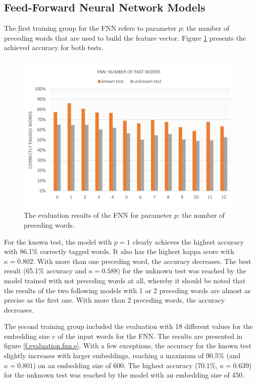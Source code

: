 \subsection{Feed-Forward Neural Network Models}\label{c.evaluation.results.fnn}
The \b{first training group} for the FNN refers to parameter $p$: the number of preceding words that are used to build the feature vector. Figure \ref{f.evaluation.fnn.p} presents the achieved accuracy for both tests.

\begin{figure}[H]
	\hspace{-5mm}\includegraphics[width=1.07\textwidth]{images/evaluation_fnn_p}
	\caption[FNN Evaluation: Number of Past Words]{The evaluation results of the FNN for parameter $p$: the number of preceding words.}
	\label{f.evaluation.fnn.p}
\end{figure}

For the known test, the model with $p=1$ clearly achieves the highest accuracy with 86.1\% correctly tagged words. It also has the highest kappa score with $\kappa=0.802$. With more than one preceding word, the accuracy decreases. The best result (65.1\% accuracy and $\kappa=0.588$) for the unknown test was reached by the model trained with not preceding words at all, whereby it should be noted that the results of the two following models with 1 or 2 preceding words are almost as precise as the first one. With more than 2 preceding words, the accuracy decreases.

The \b{second training group} included the evaluation with 18 different values for the embedding size $e$ of the input words for the FNN. The results are presented in figure \ref{f.evaluation.fnn.e}. With a few exceptions, the accuracy for the known test slightly increases with larger embeddings, reaching a maximum of 90.5\% (and $\kappa=0.801$) on an embedding size of 600. The highest accuracy (70.1\%, $\kappa=0.639$) for the unknown test was reached by the model with an embedding size of 450.

